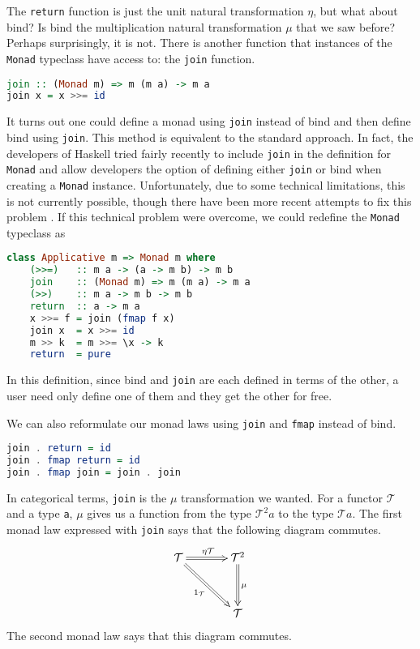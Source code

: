 \documentclass[MS, xcolor=dvipsnames]{wfuthesis}
\def\cT{\mathcal{T}}
\theoremstyle{definition}
\begin{document}
The \lstinline{return} function is just the unit natural transformation $\eta$, but what about bind? Is bind the multiplication natural transformation $\mu$ that we saw before? Perhaps surprisingly, it is not. There is another function that instances of the \lstinline{Monad} typeclass have access to: the \lstinline{join} function.
\begin{lstlisting}[language=Haskell]
join :: (Monad m) => m (m a) -> m a
join x = x >>= id
\end{lstlisting}
It turns out one could define a monad using \lstinline{join} instead of bind and then define bind using \lstinline{join}. This method is equivalent to the standard approach. In fact, the developers of Haskell tried fairly recently to include \lstinline{join} in the definition for \lstinline{Monad} and allow developers the option of defining either \lstinline{join} or bind when creating a \mbox{\lstinline{Monad}} instance. Unfortunately, due to some technical limitations, this is not currently possible, though there have been more recent attempts to fix this problem \cite{Scott2018}. If this technical problem were overcome, we could redefine the \lstinline{Monad} typeclass as
\begin{lstlisting}[language=Haskell]
class Applicative m => Monad m where
    (>>=)   :: m a -> (a -> m b) -> m b
    join    :: (Monad m) => m (m a) -> m a
    (>>)    :: m a -> m b -> m b
    return  :: a -> m a
    x >>= f = join (fmap f x)
    join x  = x >>= id
    m >> k  = m >>= \x -> k
    return  = pure
\end{lstlisting}
In this definition, since bind and \lstinline{join} are each defined in terms of the other, a user need only define one of them and they get the other for free. \par
We can also reformulate our monad laws using \lstinline{join} and \lstinline{fmap} instead of bind.
\begin{lstlisting}[language=Haskell]
join . return = id
join . fmap return = id
join . fmap join = join . join
\end{lstlisting}
In categorical terms, \lstinline{join} is the $\mu$ transformation we wanted. For a functor $\cT$ and a type \lstinline{a}, $\mu$ gives us a function from the type $\cT^2 a$ to the type $\cT a$. The first monad law expressed with \lstinline{join} says that the following diagram commutes.
\[ \SelectTips{cm}{}\xymatrix@R+1pc@C+1pc{
  \cT \ar@{=>}[r]^{\eta \cT} \ar@{=>}[dr]_{1_\cT} & \cT^2 \ar@{=>}[d]^\mu \\ & \cT
} \]
The second monad law says that this diagram commutes.
\end{document}
